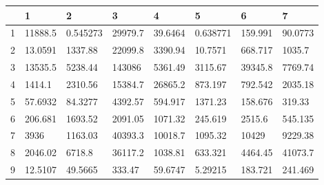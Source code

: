 \documentclass[12pt, a4paper]{article}
\begin{document}
\begin{tabular}{|l|lllllll}
\hline
{} & 1 & 2 & 3 & 4 & 5 & 6 & 7  \\
\hline
1 & 11888.5 & 0.545273 &  29979.7 &  39.6464 &                                  0.638771 &  159.991 & 90.0773  \\
2  &   13.0591 & 1337.88 & 22099.8 &  3390.94 &                                            10.7571 & 668.717 &  1035.7   \\
3                      &                                            13535.5 &                    5238.44 &                      143086 &                                            5361.49 &                                            3115.67 &        39345.8 &                                            7769.74 \\
4 &                                             1414.1 &                    2310.56 &                     15384.7 &                                            26865.2 &                                            873.197 &        792.542 &                                            2035.18  \\
5 &                                            57.6932 &                    84.3277 &                     4392.57 &                                            594.917 &                                            1371.23 &        158.676 &                                             319.33 \\
6 &                                            206.681 &                    1693.52 &                     2091.05 &                                            1071.32 &                                            245.619 &         2515.6 &                                            545.135 \\
7 &                                               3936 &                    1163.03 &                     40393.3 &                                            10018.7 &                                            1095.32 &          10429 &                                            9229.38 \\
8  &                                            2046.02 &                     6718.8 &                     36117.2 &                                            1038.81 &                                            633.321 &        4464.45 &                                            41073.7 \\
9 &                                            12.5107 &                    49.5665 &                      333.47 &                                            59.6747 &                                            5.29215 &        183.721 &                                            241.469 \\

\end{tabular}
\end{document}
